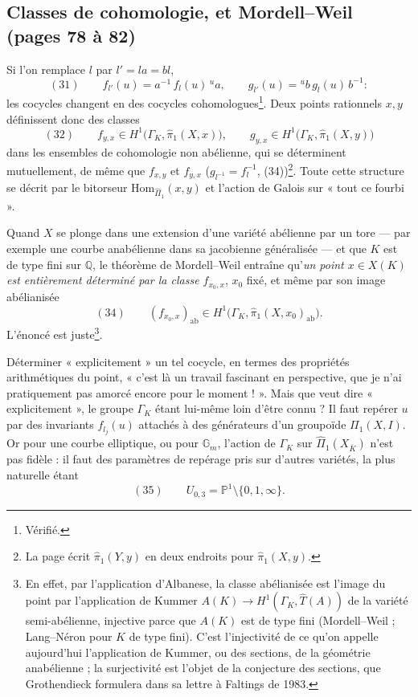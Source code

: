 \documentclass[11pt,a4paper]{article}
\begin{document}
\subsection*{Classes de cohomologie, et Mordell–Weil (pages 78 à 82)}

Si l'on remplace $l$ par $l' = la = bl$,
\[
(31)\qquad f_{l'}(u) = a^{-1}\, f_l(u)\, {}^{u}a, \qquad g_{l'}(u) = {}^{u}b\, g_l(u)\, b^{-1} :
\]
les cocycles changent en des cocycles cohomologues\footnote{Vérifié.}. Deux
points rationnels $x, y$ définissent donc des classes
\[
(32)\qquad f_{y,x} \in H^1\bigl(\Gamma_K, \widehat\pi_1(X, x)\bigr), \qquad g_{y,x} \in H^1\bigl(\Gamma_K, \widehat\pi_1(X, y)\bigr)
\]
dans les ensembles de cohomologie non abélienne, qui se déterminent
mutuellement, de même que $f_{x,y}$ et $f_{y,x}$ ($g_{l^{-1}} = f_l^{-1}$,
(34))\footnote{La page écrit $\widehat\pi_1(Y, y)$ en deux endroits pour
$\widehat\pi_1(X, y)$.}. Toute cette structure se décrit par le bitorseur
$\mathrm{Hom}_{\widehat\Pi_1}(x, y)$ et l'action de Galois sur « tout ce
fourbi ».

Quand $X$ se plonge dans une extension d'une variété abélienne par un tore
— par exemple une courbe anabélienne dans sa jacobienne généralisée — et que
$K$ est de type fini sur $\mathbb{Q}$, le théorème de Mordell–Weil entraîne
qu'\emph{un point $x \in X(K)$ est entièrement déterminé par la classe
$f_{x_0,x}$}, $x_0$ fixé, et même par son image abélianisée
\[
(34)\qquad (f_{x_0, x})_{\mathrm{ab}} \in H^1\bigl(\Gamma_K, \widehat\pi_1(X, x_0)_{\mathrm{ab}}\bigr) .
\]
L'énoncé est juste\footnote{En
effet, par l'application d'Albanese, la classe abélianisée est l'image du point
par l'application de Kummer $A(K) \to H^1(\Gamma_K, \widehat{T}(A))$ de la
variété semi-abélienne, injective parce que $A(K)$ est de type fini
(Mordell–Weil ; Lang–Néron pour $K$ de type fini). C'est l'injectivité de ce
qu'on appelle aujourd'hui l'application de Kummer, ou des sections, de la
géométrie anabélienne ; la surjectivité est l'objet de la conjecture des
sections, que Grothendieck formulera dans sa lettre à Faltings de 1983.}.

Déterminer « explicitement » un tel cocycle, en termes des propriétés
arithmétiques du point, « c'est là un travail fascinant en perspective, que je n'ai pratiquement pas amorcé encore pour le moment ! ». Mais que veut dire
« explicitement », le groupe $\Gamma_K$ étant lui-même loin d'être connu ? Il
faut repérer $u$ par des invariants $f_{l_j}(u)$ attachés à des générateurs
d'un groupoïde $\Pi_1(X, I)$. Or pour une courbe elliptique, ou pour
$\mathbb{G}_m$, l'action de $\Gamma_K$ sur $\widehat\Pi_1(X_{\overline{K}})$
n'est pas fidèle : il faut des paramètres de repérage pris sur d'autres
variétés, la plus naturelle étant
\[
(35)\qquad U_{0,3} = \mathbb{P}^1 \setminus \{0, 1, \infty\} .
\]
\end{document}

